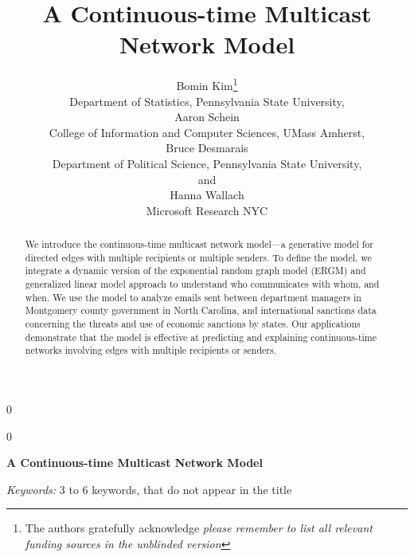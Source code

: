\documentclass[12pt]{article}
\newcommand{\blind}{0}
\begin{document}
\def\spacingset#1{\renewcommand{\baselinestretch}%
{#1}\small\normalsize} \spacingset{1}



\blind
{
  \title{\bf A Continuous-time Multicast Network Model}
  \author{Bomin Kim\thanks{
    The authors gratefully acknowledge \textit{please remember to list all relevant funding sources in the unblinded version}}\hspace{.2cm}\\
    Department of Statistics, Pennsylvania State University,\\
  Aaron Schein\\
  College of Information and Computer Sciences, UMass Amherst,\\
    Bruce Desmarais\\
    Department of Political Science, Pennsylvania State University,\\
    and\\
    Hanna Wallach\\
    Microsoft Research NYC}
  \maketitle
} \fi

\blind
{
  \bigskip
  \bigskip
  \bigskip
  \begin{center}
    {\LARGE\bf A Continuous-time Multicast Network Model}
\end{center}
  \medskip
} \fi

\bigskip
\begin{abstract}
We introduce the continuous-time multicast network model---a generative model for directed edges with multiple recipients or multiple senders. To define the model, we
integrate a dynamic version of the exponential random graph model (ERGM) and generalized linear model approach to understand who communicates with whom, and when. We use
the model to analyze emails sent between department managers in Montgomery county government in North Carolina, and international sanctions data concerning the threats and use of economic sanctions by states. Our applications demonstrate that the model is effective at predicting and explaining continuous-time networks involving edges with multiple recipients or senders.
	\end{abstract}

\noindent%
{\it Keywords:}  3 to 6 keywords, that do not appear in the title
\vfill
\end{document}
